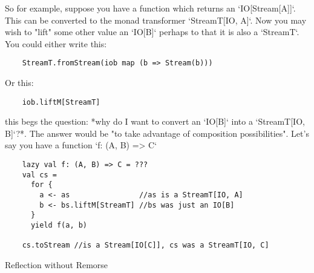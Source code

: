 \documentclass{article}
\begin{document}
So for example, suppose you have a function which returns an `IO[Stream[A]]`. This can be converted to the monad transformer `StreamT[IO, A]`. Now you may wish to "lift" some other value an `IO[B]` perhaps to that it is also a `StreamT`. You could either write this:
\begin{verbatim}
    StreamT.fromStream(iob map (b => Stream(b)))
\end{verbatim}

Or this:
\begin{verbatim}
    iob.liftM[StreamT]
\end{verbatim}    

this begs the question: *why do I want to convert an `IO[B]` into a `StreamT[IO, B]`?*. The answer would be "to take advantage of composition possibilities". Let's say you have a function `f: (A, B) => C`

\begin{verbatim}
    lazy val f: (A, B) => C = ???
    val cs = 
      for {
        a <- as                //as is a StreamT[IO, A]
        b <- bs.liftM[StreamT] //bs was just an IO[B]
      }
      yield f(a, b)

    cs.toStream //is a Stream[IO[C]], cs was a StreamT[IO, C]
\end{verbatim}



Reflection without Remorse
\end{document}
